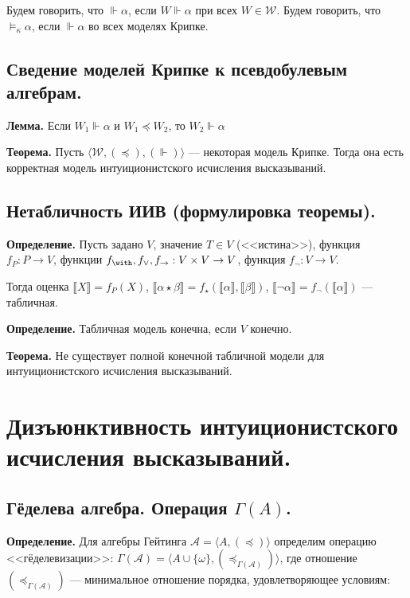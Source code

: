 \documentclass[10pt,a4paper,oneside]{article}
\begin{document}
Будем говорить, что $\Vdash\alpha$, если $W\Vdash\alpha$ при всех $W \in \mathcal{W}$.
Будем говорить, что $\models_\kappa\alpha$, если $\Vdash\alpha$ во всех моделях Крипке.

\subsection{Сведение моделей Крипке к псевдобулевым алгебрам.}
\noindent \textbf{ Лемма. }
Если $W_1 \Vdash \alpha$ и $W_1 \preceq W_2$, то $W_2 \Vdash \alpha$

\noindent \textbf{ Теорема. }
Пусть $\langle \mathcal{W}, (\preceq), (\Vdash)\rangle$ ---
некоторая модель Крипке.
Тогда она есть корректная модель интуиционистского исчисления высказываний.


\subsection{Нетабличность ИИВ (формулировка теоремы).}

\noindent \textbf{ Определение. }
Пусть задано $V$, значение $T \in V$ (<<истина>>), функция $f_P: P \rightarrow V$, 
функции $f_\with, f_\vee, f_\rightarrow : V \times V \rightarrow V$,
функция $f_\neg: V \rightarrow V$.

Тогда оценка $\llbracket X \rrbracket = f_P(X)$, 
$\llbracket \alpha\star\beta \rrbracket = f_\star(\llbracket \alpha \rrbracket, \llbracket \beta \rrbracket)$,
$\llbracket \neg\alpha \rrbracket = f_\neg(\llbracket\alpha\rrbracket)$ --- табличная.

\noindent \textbf{ Определение. }
Табличная модель конечна, если $V$ конечно.

\noindent \textbf{ Теорема. }
Не существует полной конечной табличной модели для интуиционистского исчисления высказываний.

\section{Дизъюнктивность интуиционистского исчисления высказываний.}
\subsection{Гёделева алгебра. Операция $\Gamma(A)$.}
\noindent \textbf{ Определение. }
Для алгебры Гейтинга $\mathcal{A} = \langle A, (\preceq) \rangle$ определим операцию <<гёделевизации>>: 
$\Gamma(\mathcal{A}) = \langle A\cup\{\omega\}, (\preceq_{\Gamma(\mathcal{A})}) \rangle$, где
отношение $(\preceq_{\Gamma(\mathcal{A})})$ --- минимальное отношение порядка,
удовлетворяющее условиям:
\end{document}
